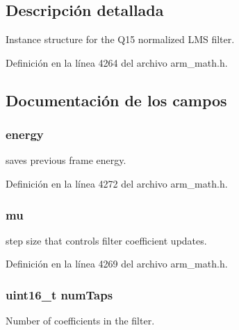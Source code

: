 \subsection{Descripción detallada}
Instance structure for the Q15 normalized L\+MS filter. 

Definición en la línea 4264 del archivo arm\+\_\+math.\+h.



\subsection{Documentación de los campos}
\subsubsection[{\texorpdfstring{energy}{energy}}]{ energy}\hypertarget{structarm__lms__norm__instance__q15_ae7a8ccabc82348f6742ca7a2b3da2a41}{}\label{structarm__lms__norm__instance__q15_ae7a8ccabc82348f6742ca7a2b3da2a41}
saves previous frame energy. 

Definición en la línea 4272 del archivo arm\+\_\+math.\+h.

\subsubsection[{\texorpdfstring{mu}{mu}}]{ mu}\hypertarget{structarm__lms__norm__instance__q15_aab4745770bd667de040227eec1b5ff8d}{}\label{structarm__lms__norm__instance__q15_aab4745770bd667de040227eec1b5ff8d}
step size that controls filter coefficient updates. 

Definición en la línea 4269 del archivo arm\+\_\+math.\+h.

\subsubsection[{\texorpdfstring{num\+Taps}{numTaps}}]{\setlength{\rightskip}{0pt plus 5cm}uint16\+\_\+t num\+Taps}\hypertarget{structarm__lms__norm__instance__q15_a751941891e47f522a7f5375fe8990aac}{}\label{structarm__lms__norm__instance__q15_a751941891e47f522a7f5375fe8990aac}
Number of coefficients in the filter. 

